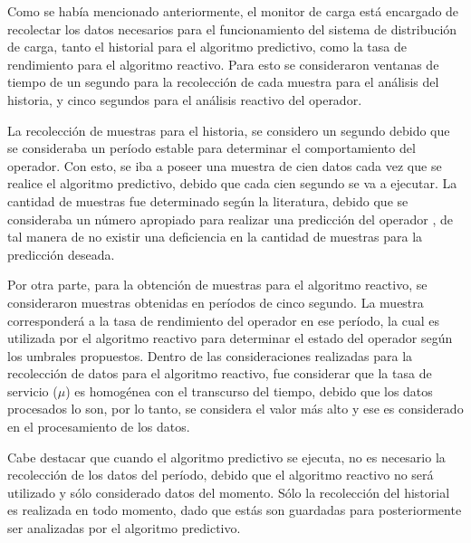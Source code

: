 Como se había mencionado anteriormente, el monitor de carga está encargado de recolectar los datos necesarios para el funcionamiento del sistema de distribución de carga, tanto el historial para el algoritmo predictivo, como la tasa de rendimiento para el algoritmo reactivo. Para esto se consideraron ventanas de tiempo de un segundo para la recolección de cada muestra para el análisis del historia, y cinco segundos para el análisis reactivo del operador.

La recolección de muestras para el historia, se considero un segundo debido que se consideraba un período estable para determinar el comportamiento del operador. Con esto, se iba a poseer una muestra de cien datos cada vez que se realice el algoritmo predictivo, debido que cada cien segundo se va a ejecutar. La cantidad de muestras fue determinado según la literatura, debido que se consideraba un número apropiado para realizar una predicción del operador \citep{ching2006markov}, de tal manera de no existir una deficiencia en la cantidad de muestras para la predicción deseada.

Por otra parte, para la obtención de muestras para el algoritmo reactivo, se consideraron muestras obtenidas en períodos de cinco segundo. La muestra corresponderá a la tasa de rendimiento del operador en ese período, la cual es utilizada por el algoritmo reactivo para determinar el estado del operador según los umbrales propuestos. Dentro de las consideraciones realizadas para la recolección de datos para el algoritmo reactivo, fue considerar que la tasa de servicio ($\mu$) es homogénea con el transcurso del tiempo, debido que los datos procesados lo son, por lo tanto, se considera el valor más alto y ese es considerado en el procesamiento de los datos. 

Cabe destacar que cuando el algoritmo predictivo se ejecuta, no es necesario la recolección de los datos del período, debido que el algoritmo reactivo no será utilizado y sólo considerado datos del momento. Sólo la recolección del historial es realizada en todo momento, dado que estás son guardadas para posteriormente ser analizadas por el algoritmo predictivo.

